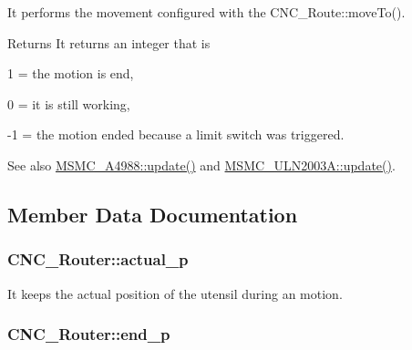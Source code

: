 It performs the movement configured with the C\+N\+C\+\_\+\+Route\+::move\+To(). 

\begin{DoxyReturn}{Returns}
It returns an integer that is
\begin{DoxyItemize}
\item 1 = the motion is end,
\item 0 = it is still working,
\item -\/1 = the motion ended because a limit switch was triggered. 
\end{DoxyItemize}
\end{DoxyReturn}
\begin{DoxySeeAlso}{See also}
\hyperlink{class_m_s_m_c___a4988_a409bea28b42827c8bd7d5e5e318af21d}{M\+S\+M\+C\+\_\+\+A4988\+::update()} and \hyperlink{class_m_s_m_c___u_l_n2003_a_acdf6b6224352a90146e67ee9837d0a6f}{M\+S\+M\+C\+\_\+\+U\+L\+N2003\+A\+::update()}. 
\end{DoxySeeAlso}


\subsection{Member Data Documentation}
\hypertarget{class_c_n_c___router_a5e1d4c6b520762621889824c192e13fb}{
\subsubsection[{actual\+\_\+p}]{ C\+N\+C\+\_\+\+Router\+::actual\+\_\+p\hspace{0.3cm}{\ttfamily [private]}}}\label{class_c_n_c___router_a5e1d4c6b520762621889824c192e13fb}


It keeps the actual position of the utensil during an motion. 

\hypertarget{class_c_n_c___router_a025944e9009cd9b63b6105c41f4665c3}{
\subsubsection[{end\+\_\+p}]{ C\+N\+C\+\_\+\+Router\+::end\+\_\+p\hspace{0.3cm}{\ttfamily [private]}}}\label{class_c_n_c___router_a025944e9009cd9b63b6105c41f4665c3}


